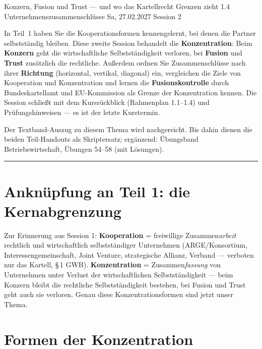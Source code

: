 \documentclass[11pt, a4paper]{article}
\begin{document}
%
  {Konzern, Fusion und Trust --- und wo das Kartellrecht Grenzen zieht}%
  {1.4 Unternehmenszusammenschlüsse}%
  {Sa, 27.02.2027 \textperiodcentered{} Session 2}

\begin{merksatz}[title={\bfseries Worum geht es in Teil 2?}]
In Teil~1 haben Sie die Kooperationsformen kennengelernt, bei denen die Partner
selbstständig bleiben. Diese zweite Session behandelt die \textbf{Konzentration}:
Beim \textbf{Konzern} geht die wirtschaftliche Selbstständigkeit verloren, bei
\textbf{Fusion} und \textbf{Trust} zusätzlich die rechtliche. Außerdem ordnen Sie
Zusammenschlüsse nach ihrer \textbf{Richtung} (horizontal, vertikal, diagonal) ein,
vergleichen die Ziele von Kooperation und Konzentration und lernen die
\textbf{Fusionskontrolle} durch Bundeskartellamt und EU-Kommission als Grenze der
Konzentration kennen. Die Session schließt mit dem Kursrückblick (Rahmenplan 1.1--1.4)
und Prüfungshinweisen --- es ist der letzte Kurstermin.
\end{merksatz}

\begin{beispiel}[title={Hinweis zur Literatur}]
Der Textband-Auszug zu diesem Thema wird nachgereicht. Bis dahin dienen die beiden
Teil-Handouts als Skriptersatz; ergänzend: Übungsband Betriebswirtschaft,
Übungen 54--58 (mit Lösungen).
\end{beispiel}

\tableofcontents
\vspace{1em}
\hrule
\vspace{1em}

\section{Anknüpfung an Teil 1: die Kernabgrenzung}

Zur Erinnerung aus Session 1: \textbf{Kooperation} = freiwillige Zusammen\emph{arbeit}
rechtlich und wirtschaftlich selbstständiger Unternehmen (ARGE/Konsortium,
Interessengemeinschaft, Joint Venture, strategische Allianz, Verband --- verboten nur
das Kartell, \S\,1 GWB). \textbf{Konzentration} = Zusammen\emph{fassung} von Unternehmen
unter Verlust der wirtschaftlichen Selbstständigkeit --- beim Konzern bleibt die
rechtliche Selbstständigkeit bestehen, bei Fusion und Trust geht auch sie verloren.
Genau diese Konzentrationsformen sind jetzt unser Thema.

\section{Formen der Konzentration}
\end{document}
